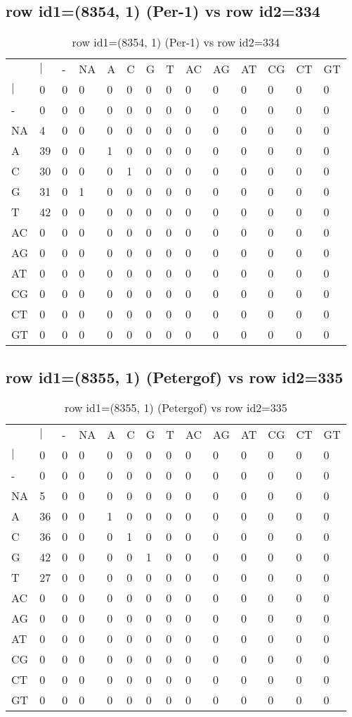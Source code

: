 \subsection{row id1=(8354, 1) (Per-1) vs row id2=334}
\begin{center}
\begin{longtable}{|l|l|l|l|l|l|l|l|l|l|l|l|l|l|}
\caption{row id1=(8354, 1) (Per-1) vs row id2=334} \label{table_dm372}\\
\hline
\\
\hline
&$|$&-&NA&A&C&G&T&AC&AG&AT&CG&CT&GT\\
$|$&0&0&0&0&0&0&0&0&0&0&0&0&0\\
-&0&0&0&0&0&0&0&0&0&0&0&0&0\\
NA&4&0&0&0&0&0&0&0&0&0&0&0&0\\
A&39&0&0&1&0&0&0&0&0&0&0&0&0\\
C&30&0&0&0&1&0&0&0&0&0&0&0&0\\
G&31&0&1&0&0&0&0&0&0&0&0&0&0\\
T&42&0&0&0&0&0&0&0&0&0&0&0&0\\
AC&0&0&0&0&0&0&0&0&0&0&0&0&0\\
AG&0&0&0&0&0&0&0&0&0&0&0&0&0\\
AT&0&0&0&0&0&0&0&0&0&0&0&0&0\\
CG&0&0&0&0&0&0&0&0&0&0&0&0&0\\
CT&0&0&0&0&0&0&0&0&0&0&0&0&0\\
GT&0&0&0&0&0&0&0&0&0&0&0&0&0\\
\hline
\end{longtable}
\end{center}

\subsection{row id1=(8355, 1) (Petergof) vs row id2=335}
\begin{center}
\begin{longtable}{|l|l|l|l|l|l|l|l|l|l|l|l|l|l|}
\caption{row id1=(8355, 1) (Petergof) vs row id2=335} \label{table_dm374}\\
\hline
\\
\hline
&$|$&-&NA&A&C&G&T&AC&AG&AT&CG&CT&GT\\
$|$&0&0&0&0&0&0&0&0&0&0&0&0&0\\
-&0&0&0&0&0&0&0&0&0&0&0&0&0\\
NA&5&0&0&0&0&0&0&0&0&0&0&0&0\\
A&36&0&0&1&0&0&0&0&0&0&0&0&0\\
C&36&0&0&0&1&0&0&0&0&0&0&0&0\\
G&42&0&0&0&0&1&0&0&0&0&0&0&0\\
T&27&0&0&0&0&0&0&0&0&0&0&0&0\\
AC&0&0&0&0&0&0&0&0&0&0&0&0&0\\
AG&0&0&0&0&0&0&0&0&0&0&0&0&0\\
AT&0&0&0&0&0&0&0&0&0&0&0&0&0\\
CG&0&0&0&0&0&0&0&0&0&0&0&0&0\\
CT&0&0&0&0&0&0&0&0&0&0&0&0&0\\
GT&0&0&0&0&0&0&0&0&0&0&0&0&0\\
\hline
\end{longtable}
\end{center}

